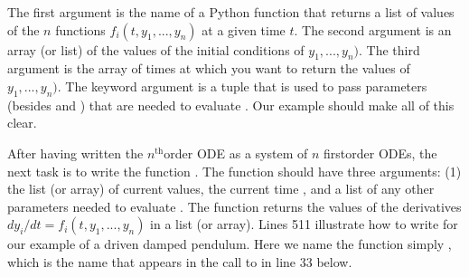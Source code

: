 \documentclass[letterpaper,10pt,english]{sphinxmanual}
\begin{document}
\begin{sphinxVerbatim}[commandchars=\\\{\}]
\end{sphinxVerbatim}

\sphinxAtStartPar
The first argument  is the name of a Python function that returns a list of values of the \(n\) functions \(f_i(t, y_1, ..., y_n)\) at a given time \(t\).  The second argument  is an array (or list) of the values of the initial conditions of \(y_1, ..., y_n)\).  The third argument is the array of times at which you want  to return the values of \(y_1, ..., y_n)\).  The keyword argument  is a tuple that is used to pass parameters (besides  and ) that are needed to evaluate .  Our example should make all of this clear.

\sphinxAtStartPar
After having written the \(n^\mathrm{th}\)\sphinxhyphen{}order ODE as a system of \(n\) first\sphinxhyphen{}order ODEs, the next task is to write the function .  The function  should have three arguments: (1) the list (or array) of current  values, the current time , and a list of any other parameters  needed to evaluate .  The function  returns the values of the derivatives \(dy_i/dt = f_i(t, y_1, ..., y_n)\) in a list (or array).  Lines 5\sphinxhyphen{}11 illustrate how to write  for our example of a driven damped pendulum.  Here we name the function simply , which is the name that appears in the call to  in line 33 below.
\end{document}
